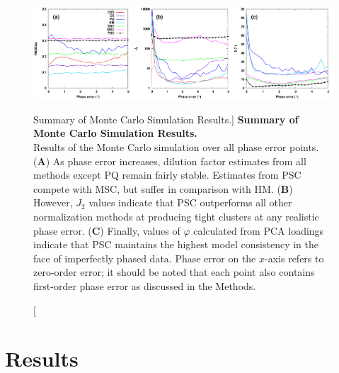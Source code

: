 \begin{figure}[ht!]
\includegraphics[width=6.5in]{figs/pscorr/04-montecarlo.png}
\caption
      [Summary of Monte Carlo Simulation Results.]{
  {\bf Summary of Monte Carlo Simulation Results.}
  \\
  Results of the Monte Carlo simulation over all phase error points.
  ({\bf A}) As phase error increases, dilution factor estimates from all
  methods except PQ remain fairly stable. Estimates from PSC compete with
  MSC, but suffer in comparison with HM.
  ({\bf B}) However, $J_2$ values indicate that PSC outperforms all other
  normalization methods at producing tight clusters at any realistic
  phase error.
  ({\bf C}) Finally, values of $\varphi$ calculated from PCA loadings indicate
  that PSC maintains the highest model consistency in the face of imperfectly
  phased data. Phase error on the $x$-axis refers to zero-order error; it
  should be noted that each point also contains first-order phase error as
  discussed in the Methods.
}
\label{figure.6.4}
\end{figure}

\section{Results}

